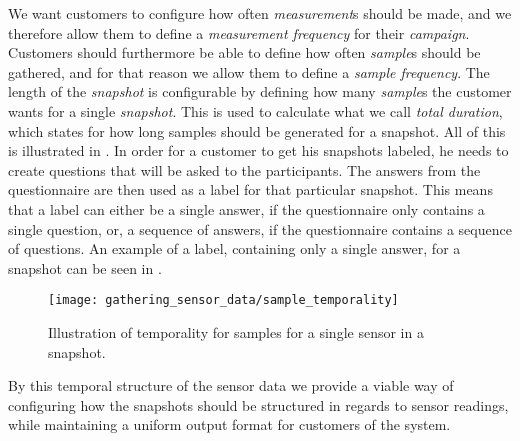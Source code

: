 We want customers to configure how often \emph{measurement}s should be made, and we therefore allow them to define a \emph{measurement frequency} for their \emph{campaign}. Customers should furthermore be able to define how often \emph{sample}s should be gathered, and for that reason we allow them to define a \emph{sample frequency}. The length of the \emph{snapshot} is configurable by defining how many \emph{sample}s the customer wants for a single \emph{snapshot}. This is used to calculate what we call \emph{total duration}, which states for how long samples should be generated for a snapshot. All of this is illustrated in . In order for a customer to get his snapshots labeled, he needs to create questions that will be asked to the participants. The answers from the questionnaire are then used as a label for that particular snapshot. This means that a label can either be a single answer, if the questionnaire only contains a single question, or, a sequence of answers, if the questionnaire contains a sequence of questions. An example of a label, containing only a single answer, for a snapshot can be seen in .

\begin{figure}[!htbp]
    \centering
    \texttt{[image: gathering\_sensor\_data/sample\_temporality]}
    \caption{Illustration of temporality for samples for a single sensor in a snapshot.}
    \label{fig:sample_temporality}
\end{figure}
\FloatBarrier

By this temporal structure of the sensor data we provide a viable way of configuring how the snapshots should be structured in regards to sensor readings, while maintaining a uniform output format for customers of the system.
